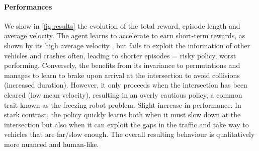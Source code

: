 \documentclass{article}
\begin{document}
{\paragraph{Performances}

We show in \autoref{fig:results} the evolution of the total reward, episode length and average velocity.
The \MLPC agent learns to accelerate to earn short-term rewards, as shown by its high average velocity , but fails to exploit the information of other vehicles and crashes often, leading to shorter episodes = risky policy, worst performing.
Conversely, the \MLPG benefits from its invariance to permutations and manages to learn to brake upon arrival at the intersection to avoid collisions (increased duration). However, it only proceeds when the intersection has been cleared (low mean velocity), resulting in an overly cautious policy, a common trait known as the freezing robot problem. Slight increase in performance.
In stark contrast, the \EgoAtt policy quickly learns both when it must slow down at the intersection but also when it can exploit the gaps in the traffic and take way to vehicles that are far/slow enough. The overall resulting behaviour is qualitatively more nuanced and human-like.

}
\end{document}
